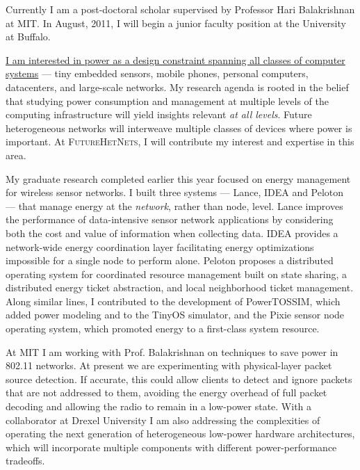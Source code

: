
Currently I am a post-doctoral scholar supervised by Professor Hari
Balakrishnan at MIT. In August, 2011, I will begin a junior faculty position
at the University at Buffalo.


\uline{I am interested in power as a design constraint spanning all classes
of computer systems} --- tiny embedded sensors, mobile phones, personal
computers, datacenters, and large-scale networks. My research agenda is
rooted in the belief that studying power consumption and management at
multiple levels of the computing infrastructure will yield insights relevant
\textit{at all levels}. Future heterogeneous networks will interweave
multiple classes of devices where power is important. At {\scshape
FutureHetNets}, I will contribute my interest and expertise in this area.

My graduate research completed earlier this year focused on energy management
for wireless sensor networks. I built three systems --- Lance, IDEA and
Peloton --- that manage energy at the \textit{network}, rather than node,
level. Lance improves the performance of data-intensive sensor network
applications by considering both the cost and value of information when
collecting data. IDEA provides a network-wide energy coordination layer
facilitating energy optimizations impossible for a single node to perform
alone. Peloton proposes a distributed operating system for coordinated
resource management built on state sharing, a distributed energy ticket
abstraction, and local neighborhood ticket management. Along similar lines, I
contributed to the development of PowerTOSSIM, which added power modeling and
to the TinyOS simulator, and the Pixie sensor node operating system, which
promoted energy to a first-class system resource.

At MIT I am working with Prof. Balakrishnan on techniques to save power in
802.11 networks. At present we are experimenting with physical-layer packet
source detection. If accurate, this could allow clients to detect and ignore
packets that are not addressed to them, avoiding the energy overhead of full
packet decoding and allowing the radio to remain in a low-power state. With a
collaborator at Drexel University I am also addressing the complexities of
operating the next generation of heterogeneous low-power hardware
architectures, which will incorporate multiple components with different
power-performance tradeoffs.

